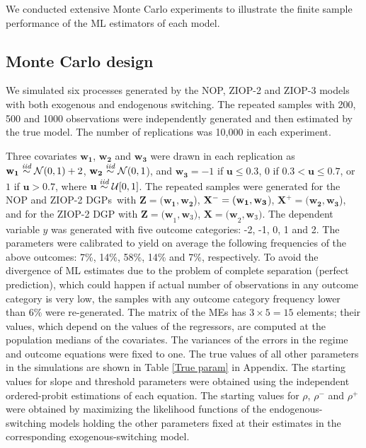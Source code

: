\documentclass[letterpaper,fleqn,12pt]{article}
\begin{document}
\begin{onehalfspace}
We conducted extensive Monte Carlo experiments to illustrate the finite
sample performance of the ML estimators of each model.

\subsection{Monte Carlo design}

We simulated six processes generated by the NOP, ZIOP-2 and ZIOP-3 models
with both exogenous and endogenous switching. The repeated samples with 200,
500 and 1000 observations were independently generated and then estimated by
the true model. The number of replications was 10,000 in each experiment.

Three covariates $\mathbf{w}_{\mathbf{1}}$, $\mathbf{w}_{\mathbf{2}}$ and $%
\mathbf{w}_{\mathbf{3}}$ were drawn in each replication as\noindent\ $%
\mathbf{w}_{\mathbf{1}}\overset{\emph{iid}}{\sim }\mathcal{N}(0,1)+2$, $%
\mathbf{w}_{\mathbf{2}}\overset{\emph{iid}}{\sim }\mathcal{N}(0,1$), and $%
\mathbf{w}_{\mathbf{3}}=-1$ if $\mathbf{u}\leq 0.3$, $0$ if $0.3<\mathbf{u}%
\leq 0.7$, or $1$ if $\mathbf{u}>0.7$, where $\mathbf{u}\overset{\emph{iid}}{%
\sim }\mathcal{U}[0,1]$. The repeated samples were generated for the NOP and
ZIOP-2 DGPs\textit{\ }with $\mathbf{Z=(w_{1}},\mathbf{w_{2}}$), $\mathbf{%
\mathbf{X}^{-}=(w_{1}},\mathbf{w_{3}}$), $\mathbf{\mathbf{X}^{+}=(w_{2}},%
\mathbf{w_{3}}$), and for the ZIOP-2 DGP with $\mathbf{Z=(w}_{1},\mathbf{w}%
_{3})$, $\mathbf{\mathbf{X}=(w}_{2},\mathbf{w}_{3})$. The dependent variable 
$y$ was generated with five outcome categories: -2, -1, 0, 1 and 2. The
parameters were calibrated to yield on average the following frequencies of
the above outcomes: 7\%, 14\%, 58\%, 14\% and 7\%, respectively. To avoid
the divergence of ML estimates due to the problem of complete separation
(perfect prediction), which could happen if actual number of observations in
any outcome category is very low, the samples with any outcome category
frequency lower than 6\% were re-generated. The matrix of the MEs has $%
3\times 5=15$ elements; their values, which depend on the values of the
regressors, are computed at the population medians of the covariates. The
variances of the errors in the regime and outcome equations were fixed to
one. The true values of all other parameters in the simulations are shown in
Table \ref{True param} in Appendix. The starting values for slope and
threshold parameters were obtained using the independent ordered-probit
estimations of each equation. The starting values for $\rho $, $\rho ^{-}$
and $\rho ^{+}$ were obtained by maximizing the likelihood functions of the
endogenous-switching models holding the other parameters fixed at their
estimates in the corresponding exogenous-switching model.


\end{onehalfspace}
\end{document}
